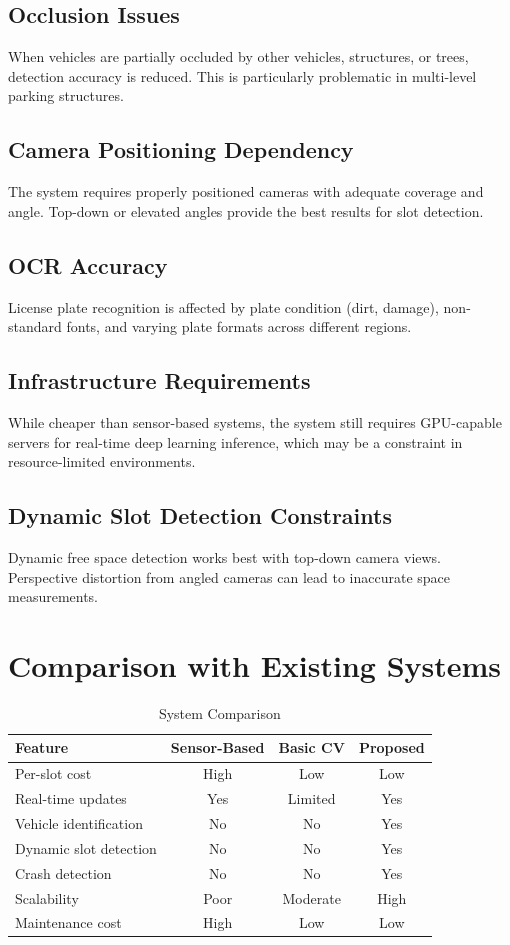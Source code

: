 \documentclass[12pt,a4paper]{report}
\begin{document}
\subsection{Occlusion Issues}
When vehicles are partially occluded by other vehicles, structures, or trees, detection accuracy is reduced. This is particularly problematic in multi-level parking structures.

\subsection{Camera Positioning Dependency}
The system requires properly positioned cameras with adequate coverage and angle. Top-down or elevated angles provide the best results for slot detection.

\subsection{OCR Accuracy}
License plate recognition is affected by plate condition (dirt, damage), non-standard fonts, and varying plate formats across different regions.

\subsection{Infrastructure Requirements}
While cheaper than sensor-based systems, the system still requires GPU-capable servers for real-time deep learning inference, which may be a constraint in resource-limited environments.

\subsection{Dynamic Slot Detection Constraints}
Dynamic free space detection works best with top-down camera views. Perspective distortion from angled cameras can lead to inaccurate space measurements.

\section{Comparison with Existing Systems}

\begin{table}[H]
\centering
\caption{System Comparison}
\begin{tabular}{|l|c|c|c|}
\hline
\textbf{Feature} & \textbf{Sensor-Based} & \textbf{Basic CV} & \textbf{Proposed} \\
\hline
Per-slot cost & High & Low & Low \\
\hline
Real-time updates & Yes & Limited & Yes \\
\hline
Vehicle identification & No & No & Yes \\
\hline
Dynamic slot detection & No & No & Yes \\
\hline
Crash detection & No & No & Yes \\
\hline
Scalability & Poor & Moderate & High \\
\hline
Maintenance cost & High & Low & Low \\
\hline
\end{tabular}
\end{table}
\end{document}
